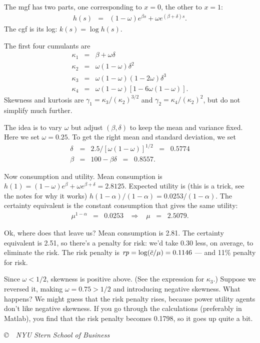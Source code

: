\documentclass[11pt]{exam}
\begin{document}
\begin{questions}
\begin{solution}
\begin{parts}
\item The mgf has two parts, one corresponding to $x=0$, the
other to $x=1$:
\begin{eqnarray*}
    h(s) &=& (1-\omega) e^{\beta s} + \omega e^{(\beta + \delta)s} .
\end{eqnarray*}
The cgf is its log:  $k(s) = \log h(s)$.
\item The first four cumulants are
\begin{eqnarray*}
    \kappa_1 &=& \beta + \omega \delta \\
    \kappa_2 &=& \omega (1-\omega) \delta^2 \\
    \kappa_3 &=& \omega (1-\omega) (1-2\omega) \delta^3 \\
    \kappa_4 &=& \omega (1-\omega) [1-6 \omega (1-\omega)] .
\end{eqnarray*}
Skewness and kurtosis are
$ \gamma_1 = \kappa_3/(\kappa_2)^{3/2}$ and
$ \gamma_2 = \kappa_4/(\kappa_2)^{2}$, but do not simplify much further.

\item The idea is to vary $\omega$ but adjust $(\beta,\delta)$ to keep the mean
and variance fixed.
Here we set $\omega = 0.25$.
To get the right mean and standard deviation, we set
\begin{eqnarray*}
    \delta &=& 2.5/[\omega (1-\omega)]^{1/2} \;\;=\;\; 0.5774 \\
    \beta  &=& 100 - \beta \delta \;\;=\;\; 0.8557 .
\end{eqnarray*}

\item Now consumption and utility.  Mean consumption is
$h(1) = (1-\omega) e^\beta + \omega e^{\beta + \delta} = 2.8125 $.
Expected utility is (this is a trick, see the notes for why it works)
$ h(1-\alpha)/(1-\alpha) = 0.0253/(1-\alpha)$.
The certainty equivalent is the constant consumption that gives the same
utility:
\begin{eqnarray*}
    \mu^{1-\alpha} &=& 0.0253 \;\;\;\Rightarrow\;\;\; \mu \;\;=\;\; 2.5079.
\end{eqnarray*}

Ok, where does that leave us?
Mean consumption is 2.81.
The certainty equivalent is 2.51, so there's a penalty for risk:
we'd take 0.30 less, on average, to eliminate the risk.
The risk penalty is $ \mbox{\it rp\/} = \log (\bar{c}/\mu) = 0.1146$ ---
and 11\% penalty for risk.

\item Since $\omega < 1/2$, skewness is positive above.
(See the expression for $\kappa_3$.)
Suppose we reversed it, making $ \omega = 0.75 > 1/2$ and introducing
negative skewness.
What happens?
We might guess that the risk penalty rises, because power utility agents
don't like negative skewness.
If you go through the calculations (preferably in Matlab),
you find that the risk penalty becomes 0.1798, so it goes up quite a bit.

\end{parts}
\end{solution}

\end{questions}

\vfill \centerline{\it \copyright \ \number\year \
NYU Stern School of Business}
\end{document}
